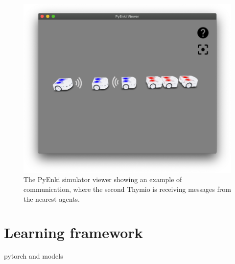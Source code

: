 \begin{figure}[h!tb]
	\centering
	\includegraphics[width=.6\textwidth]{contents/images/thymio-comm}
	\caption{The PyEnki simulator viewer showing an example of communication, 
	where the second Thymio is receiving messages from the nearest agents.}
	\label{fig:thymio comm}
\end{figure}

\section{Learning framework}
\label{sec:learning}

pytorch and models
